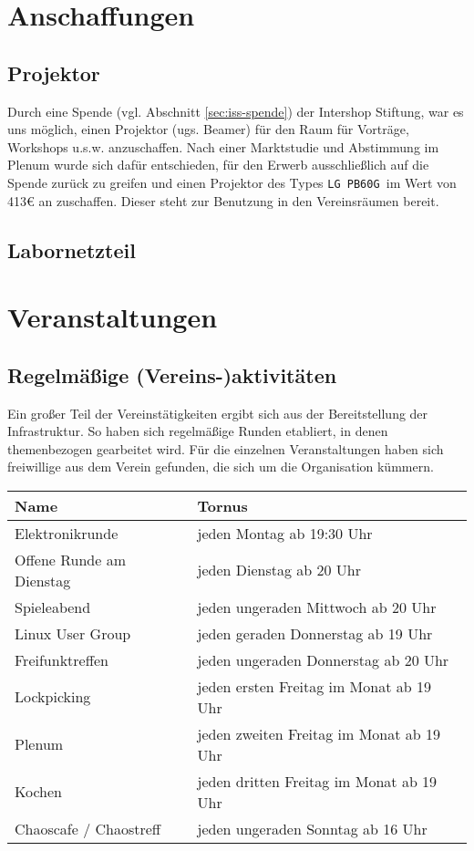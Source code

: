 \documentclass[10pt,DIV16]{scrartcl}
\begin{document}
\section{Anschaffungen}


\subsection{Projektor}
\label{sec:beamerkauf}

Durch eine Spende (vgl. Abschnitt \ref{sec:iss-spende}) der
Intershop Stiftung, war es uns möglich, einen Projektor (ugs. Beamer) für den Raum
für Vorträge, Workshops u.s.w. anzuschaffen. Nach einer Marktstudie
und Abstimmung im Plenum wurde sich dafür entschieden, für den
Erwerb ausschließlich auf die Spende zurück zu greifen und einen
Projektor des Types \texttt{LG PB60G }im Wert von 413\euro{} an
zuschaffen. Dieser steht zur Benutzung in den Vereinsräumen bereit.

\subsection{Labornetzteil}
\label{sec:labornetzteil}

\section{Veranstaltungen}

\subsection{Regelmäßige (Vereins-)aktivitäten}

Ein großer Teil der Vereinstätigkeiten ergibt sich aus der
Bereitstellung der Infrastruktur. So haben sich regelmäßige Runden
etabliert, in denen themenbezogen gearbeitet wird. Für die
einzelnen Veranstaltungen haben sich freiwillige aus dem Verein
gefunden, die sich um die Organisation kümmern.

\begin{table}[h]
	\begin{tabular}{l|l}
		Name   &  Tornus \\ \hline
		Elektronikrunde   &  jeden Montag ab 19:30 Uhr\\
		Offene Runde am Dienstag   &  jeden Dienstag ab 20 Uhr\\
		Spieleabend   &  jeden ungeraden Mittwoch ab 20 Uhr\\
		Linux User Group   &  jeden geraden Donnerstag ab 19 Uhr\\
		Freifunktreffen   &  jeden ungeraden Donnerstag ab 20 Uhr\\
		Lockpicking   &  jeden ersten Freitag im Monat ab 19 Uhr\\
		Plenum   &  jeden zweiten Freitag im Monat ab 19 Uhr\\
		Kochen   &  jeden dritten Freitag im Monat ab 19 Uhr\\
		Chaoscafe / Chaostreff   &  jeden ungeraden Sonntag ab 16 Uhr\\
\end{tabular}
\end{table}
\end{document}
